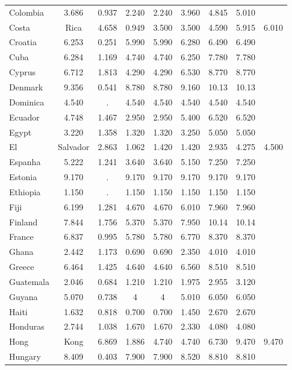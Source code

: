 \documentclass[]{article}
\begin{document}
\begin{tabular}{lcccccccc}
Colombia & 3.686 & 0.937 & 2.240 & 2.240 & 3.960 & 4.845 & 5.010 &  \\
Costa & Rica & 4.658 & 0.949 & 3.500 & 3.500 & 4.590 & 5.915 & 6.010 \\
Croatia & 6.253 & 0.251 & 5.990 & 5.990 & 6.280 & 6.490 & 6.490 &  \\
Cuba & 6.284 & 1.169 & 4.740 & 4.740 & 6.250 & 7.780 & 7.780 &  \\
Cyprus & 6.712 & 1.813 & 4.290 & 4.290 & 6.530 & 8.770 & 8.770 &  \\
Denmark & 9.356 & 0.541 & 8.780 & 8.780 & 9.160 & 10.13 & 10.13 &  \\
Dominica & 4.540 & . & 4.540 & 4.540 & 4.540 & 4.540 & 4.540 &  \\
Ecuador & 4.748 & 1.467 & 2.950 & 2.950 & 5.400 & 6.520 & 6.520 &  \\
Egypt & 3.220 & 1.358 & 1.320 & 1.320 & 3.250 & 5.050 & 5.050 &  \\
El & Salvador & 2.863 & 1.062 & 1.420 & 1.420 & 2.935 & 4.275 & 4.500 \\
Espanha & 5.222 & 1.241 & 3.640 & 3.640 & 5.150 & 7.250 & 7.250 &  \\
Estonia & 9.170 & . & 9.170 & 9.170 & 9.170 & 9.170 & 9.170 &  \\
Ethiopia & 1.150 & . & 1.150 & 1.150 & 1.150 & 1.150 & 1.150 &  \\
Fiji & 6.199 & 1.281 & 4.670 & 4.670 & 6.010 & 7.960 & 7.960 &  \\
Finland & 7.844 & 1.756 & 5.370 & 5.370 & 7.950 & 10.14 & 10.14 &  \\
France & 6.837 & 0.995 & 5.780 & 5.780 & 6.770 & 8.370 & 8.370 &  \\
Ghana & 2.442 & 1.173 & 0.690 & 0.690 & 2.350 & 4.010 & 4.010 &  \\
Greece & 6.464 & 1.425 & 4.640 & 4.640 & 6.560 & 8.510 & 8.510 &  \\
Guatemala & 2.046 & 0.684 & 1.210 & 1.210 & 1.975 & 2.955 & 3.120 &  \\
Guyana & 5.070 & 0.738 & 4 & 4 & 5.010 & 6.050 & 6.050 &  \\
Haiti & 1.632 & 0.818 & 0.700 & 0.700 & 1.450 & 2.670 & 2.670 &  \\
Honduras & 2.744 & 1.038 & 1.670 & 1.670 & 2.330 & 4.080 & 4.080 &  \\
Hong & Kong & 6.869 & 1.886 & 4.740 & 4.740 & 6.730 & 9.470 & 9.470 \\
Hungary & 8.409 & 0.403 & 7.900 & 7.900 & 8.520 & 8.810 & 8.810 &  \\

\end{tabular}
\end{document}
